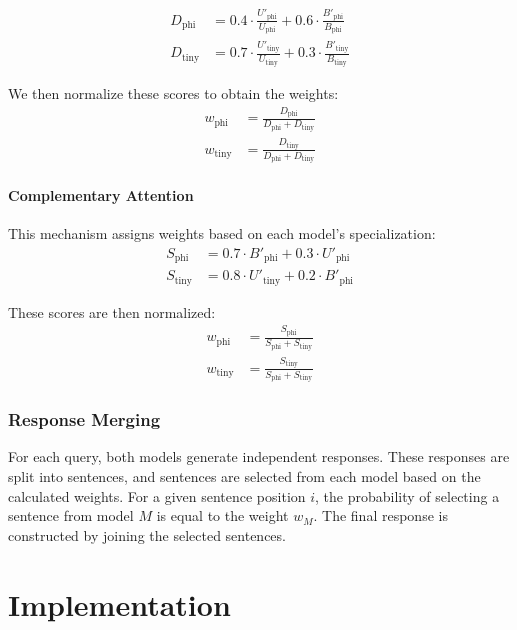 \documentclass[conference]{IEEEtran}
\begin{document}
\begin{align}
D_{\text{phi}} &= 0.4 \cdot \frac{U'_{\text{phi}}}{U_{\text{phi}}} + 0.6 \cdot \frac{B'_{\text{phi}}}{B_{\text{phi}}} \\
D_{\text{tiny}} &= 0.7 \cdot \frac{U'_{\text{tiny}}}{U_{\text{tiny}}} + 0.3 \cdot \frac{B'_{\text{tiny}}}{B_{\text{tiny}}}
\end{align}

We then normalize these scores to obtain the weights:
\begin{align}
w_{\text{phi}} &= \frac{D_{\text{phi}}}{D_{\text{phi}} + D_{\text{tiny}}} \\
w_{\text{tiny}} &= \frac{D_{\text{tiny}}}{D_{\text{phi}} + D_{\text{tiny}}}
\end{align}

\paragraph{Complementary Attention}
This mechanism assigns weights based on each model's specialization:
\begin{align}
S_{\text{phi}} &= 0.7 \cdot B'_{\text{phi}} + 0.3 \cdot U'_{\text{phi}} \\
S_{\text{tiny}} &= 0.8 \cdot U'_{\text{tiny}} + 0.2 \cdot B'_{\text{phi}}
\end{align}

These scores are then normalized:
\begin{align}
w_{\text{phi}} &= \frac{S_{\text{phi}}}{S_{\text{phi}} + S_{\text{tiny}}} \\
w_{\text{tiny}} &= \frac{S_{\text{tiny}}}{S_{\text{phi}} + S_{\text{tiny}}}
\end{align}

\subsubsection{Response Merging}
For each query, both models generate independent responses. These responses are split into sentences, and sentences are selected from each model based on the calculated weights. For a given sentence position $i$, the probability of selecting a sentence from model $M$ is equal to the weight $w_M$. The final response is constructed by joining the selected sentences.

\section{Implementation}
\end{document}
